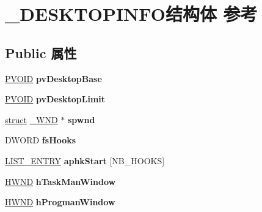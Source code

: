 \hypertarget{struct___d_e_s_k_t_o_p_i_n_f_o}{}\section{\+\_\+\+D\+E\+S\+K\+T\+O\+P\+I\+N\+F\+O结构体 参考}
\label{struct___d_e_s_k_t_o_p_i_n_f_o}
\subsection*{Public 属性}
\begin{DoxyCompactItemize}
\item 
\mbox{\label{struct___d_e_s_k_t_o_p_i_n_f_o_ad27cc4fd19b23b7643740990bfeeffce}} 
\hyperlink{interfacevoid}{P\+V\+O\+ID} {\bfseries pv\+Desktop\+Base}
\item 
\mbox{\label{struct___d_e_s_k_t_o_p_i_n_f_o_ace41d97b3e4dae56db91aba3f8edb9e3}} 
\hyperlink{interfacevoid}{P\+V\+O\+ID} {\bfseries pv\+Desktop\+Limit}
\item 
\mbox{\label{struct___d_e_s_k_t_o_p_i_n_f_o_a8381b6ea0a421c530873d795e73c8475}} 
\hyperlink{interfacestruct}{struct} \hyperlink{struct___w_n_d}{\+\_\+\+W\+ND} $\ast$ {\bfseries spwnd}
\item 
\mbox{\label{struct___d_e_s_k_t_o_p_i_n_f_o_a031280db9e1891b37e270a965c14bea9}} 
D\+W\+O\+RD {\bfseries fs\+Hooks}
\item 
\mbox{\label{struct___d_e_s_k_t_o_p_i_n_f_o_a5e46eec0cf90cc1975285151c7a0c382}} 
\hyperlink{struct___l_i_s_t___e_n_t_r_y}{L\+I\+S\+T\+\_\+\+E\+N\+T\+RY} {\bfseries aphk\+Start} \mbox{[}N\+B\+\_\+\+H\+O\+O\+KS\mbox{]}
\item 
\mbox{\label{struct___d_e_s_k_t_o_p_i_n_f_o_a7f6dda4d035bdd3780b109976ed968c3}} 
\hyperlink{interfacevoid}{H\+W\+ND} {\bfseries h\+Task\+Man\+Window}
\item 
\mbox{\label{struct___d_e_s_k_t_o_p_i_n_f_o_a16e803b19ed0ab93ba303e36c0593625}} 
\hyperlink{interfacevoid}{H\+W\+ND} {\bfseries h\+Progman\+Window}

\end{DoxyCompactItemize}
